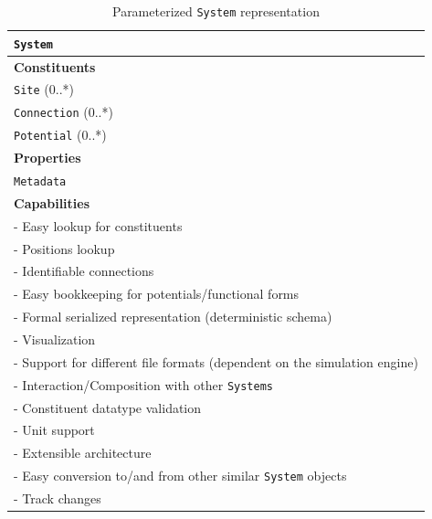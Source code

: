 \documentclass[12pt]{article}
\begin{document}
\begin{table}[ht]
    \centering
     \caption{Parameterized \texttt{System} representation}
    \begin{tabular}{|l|}
         \hline
         \rowcolor{gray!50}
        \texttt{System}  \\
         \hline
         \textbf{Constituents} \\
         \texttt{Site} (0..*) \\
         \texttt{Connection} (0..*)\\
         \texttt{Potential} (0..*)\\
         \hline
         \textbf{Properties}\\
         \texttt{Metadata} \\
         \hline
         \textbf{Capabilities}\\
         \hline
         - Easy lookup for constituents \\
         - Positions lookup \\
         - Identifiable connections \\
         - Easy bookkeeping for potentials/functional forms \\
         - Formal serialized representation (deterministic schema) \\
         - Visualization \\
         - Support for different file formats (dependent on the simulation engine) \\
         - Interaction/Composition with other \texttt{Systems}\\
         - Constituent datatype validation \\
         - Unit support \\
         - Extensible architecture \\
         - Easy conversion to/and from other similar \texttt{System} objects\\
         - Track changes \\

        \hline

    \end{tabular}
    \label{tab:TopologySpec}
\end{table}
\end{document}
